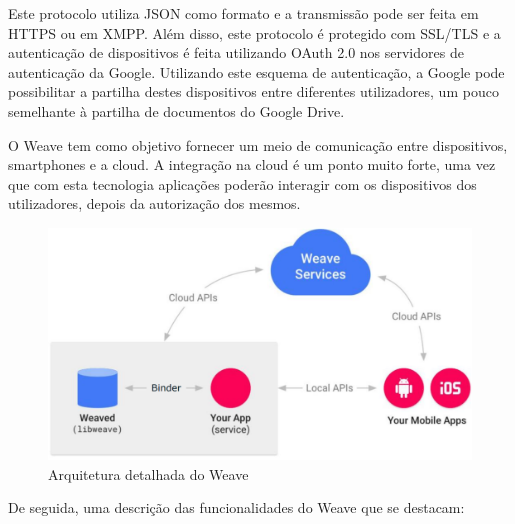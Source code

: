 Este protocolo utiliza JSON como formato e a transmissão pode ser feita em HTTPS ou em XMPP. Além disso, este protocolo é protegido com SSL/TLS e a autenticação de dispositivos é feita utilizando OAuth 2.0 nos servidores de autenticação da Google. Utilizando este esquema de autenticação, a Google pode possibilitar a partilha destes dispositivos entre diferentes utilizadores, um pouco semelhante à partilha de documentos do Google Drive.

O Weave tem como objetivo fornecer um meio de comunicação entre dispositivos, smartphones e a cloud. A integração na cloud é um ponto muito forte, uma vez que com esta tecnologia aplicações poderão interagir com os dispositivos dos utilizadores, depois da autorização dos mesmos. 

\begin{figure}[H]
  \centering
        \includegraphics[width=\textwidth]{img/weave1.png}
  \caption{Arquitetura detalhada do Weave}
\end{figure}

De seguida, uma descrição das funcionalidades do Weave que se destacam:

